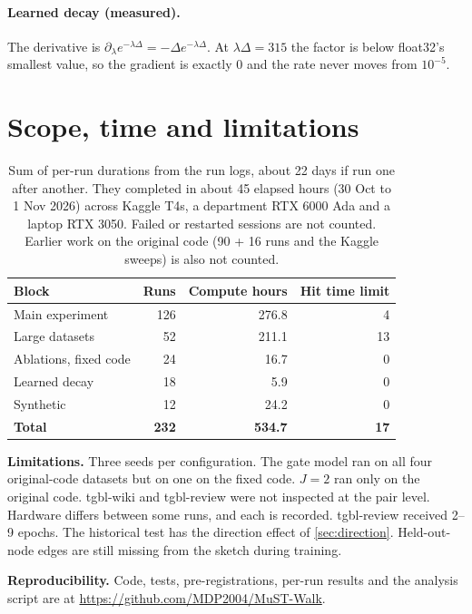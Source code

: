 \documentclass[11pt,a4paper]{article}
\theoremstyle{remark}
\newcommand{\repourl}{\url{https://github.com/MDP2004/MuST-Walk}}
\begin{document}
\paragraph{Learned decay (measured).} The derivative is $\partial_\lambda e^{-\lambda\Delta}=-\Delta e^{-\lambda\Delta}$. At $\lambda\Delta=315$ the factor is below float32's smallest value, so the gradient is exactly $0$ and the rate never moves from $10^{-5}$.

\section{Scope, time and limitations}
\begin{table}[h]\centering\small
\begin{tabular}{lrrr}
\toprule
Block & Runs & Compute hours & Hit time limit\\
\midrule
Main experiment & 126 & 276.8 & 4\\
Large datasets & 52 & 211.1 & 13\\
Ablations, fixed code & 24 & 16.7 & 0\\
Learned decay & 18 & 5.9 & 0\\
Synthetic & 12 & 24.2 & 0\\
\midrule
\textbf{Total} & \textbf{232} & \textbf{534.7} & \textbf{17}\\
\bottomrule
\end{tabular}
\caption{Sum of per-run durations from the run logs, about 22 days if run one after another. They completed in about 45 elapsed hours (30 Oct to 1 Nov 2026) across Kaggle T4s, a department RTX 6000 Ada and a laptop RTX 3050. Failed or restarted sessions are not counted. Earlier work on the original code (90 + 16 runs and the Kaggle sweeps) is also not counted.}\label{tab:time}
\end{table}

\textbf{Limitations.} Three seeds per configuration. The gate model ran on all four original-code datasets but on one on the fixed code. $J=2$ ran only on the original code. tgbl-wiki and tgbl-review were not inspected at the pair level. Hardware differs between some runs, and each is recorded. tgbl-review received 2--9 epochs. The historical test has the direction effect of \cref{sec:direction}. Held-out-node edges are still missing from the sketch during training.

\textbf{Reproducibility.} Code, tests, pre-registrations, per-run results and the analysis script are at \repourl.
\end{document}
